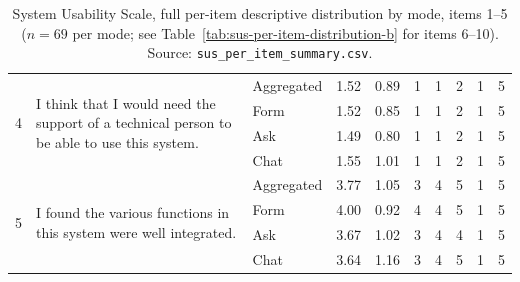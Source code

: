 \begin{table}
\begin{tabularx}{\textheight}{@{}c X l r r r r r r r@{}}
\midrule
\multirow{4}{*}{4}  & \multirow{4}{=}{I think that I would need the support of a technical person to be able to use this system.}
                    & Aggregated  & 1.52 & 0.89 & 1 & 1 & 2 & 1 & 5 \\
                    & & Form & 1.52 & 0.85 & 1 & 1 & 2 & 1 & 5 \\
                    & & Ask  & 1.49 & 0.80 & 1 & 1 & 2 & 1 & 5 \\
                    & & Chat & 1.55 & 1.01 & 1 & 1 & 2 & 1 & 5 \\
\midrule
\multirow{4}{*}{5}  & \multirow{4}{=}{I found the various functions in this system were well integrated.}
                    & Aggregated  & 3.77 & 1.05 & 3 & 4 & 5 & 1 & 5 \\
                    & & Form & 4.00 & 0.92 & 4 & 4 & 5 & 1 & 5 \\
                    & & Ask  & 3.67 & 1.02 & 3 & 4 & 4 & 1 & 5 \\
                    & & Chat & 3.64 & 1.16 & 3 & 4 & 5 & 1 & 5 \\
\bottomrule
\end{tabularx}
\caption{System Usability Scale, full per-item descriptive
distribution by mode, items 1--5 ($n = 69$ per mode; see
Table~\ref{tab:sus-per-item-distribution-b} for items 6--10).
Source: \texttt{sus\_per\_item\_summary.csv}.}
\label{tab:sus-per-item-distribution-a}
\end{table}
\FloatBarrier

